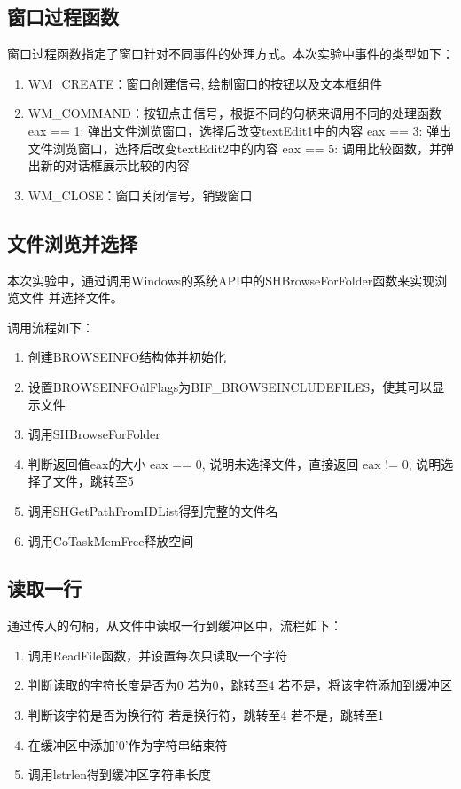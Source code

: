 \subsection{窗口过程函数}

窗口过程函数指定了窗口针对不同事件的处理方式。本次实验中事件的类型如下：

\begin{enumerate}
    \item WM\_CREATE：窗口创建信号, 绘制窗口的按钮以及文本框组件
    \item WM\_COMMAND：按钮点击信号，根据不同的句柄来调用不同的处理函数
        \iitem eax == 1: 弹出文件浏览窗口，选择后改变textEdit1中的内容
        \iitem eax == 3: 弹出文件浏览窗口，选择后改变textEdit2中的内容   
        \iitem eax == 5: 调用比较函数，并弹出新的对话框展示比较的内容   
    \item WM\_CLOSE：窗口关闭信号，销毁窗口
\end{enumerate}


\subsection{文件浏览并选择}
本次实验中，通过调用Windows的系统API中的SHBrowseForFolder函数来实现浏览文件
并选择文件。

调用流程如下：
\begin{enumerate}
    \item 创建BROWSEINFO结构体并初始化
    \item 设置BROWSEINFO\.ulFlags为BIF\_BROWSEINCLUDEFILES，使其可以显示文件
    \item 调用SHBrowseForFolder
    \item 判断返回值eax的大小
        \iitem eax == 0, 说明未选择文件，直接返回
        \iitem eax != 0, 说明选择了文件，跳转至5
    \item 调用SHGetPathFromIDList得到完整的文件名
    \item 调用CoTaskMemFree释放空间
\end{enumerate}

\subsection{读取一行}

通过传入的句柄，从文件中读取一行到缓冲区中，流程如下：
\begin{enumerate}
    \item 调用ReadFile函数，并设置每次只读取一个字符
    \item 判断读取的字符长度是否为0
        \iitem 若为0，跳转至4
        \iitem 若不是，将该字符添加到缓冲区
    \item 判断该字符是否为换行符
        \iitem 若是换行符，跳转至4
        \iitem 若不是，跳转至1
    \item 在缓冲区中添加'0'作为字符串结束符
    \item 调用lstrlen得到缓冲区字符串长度
\end{enumerate}

